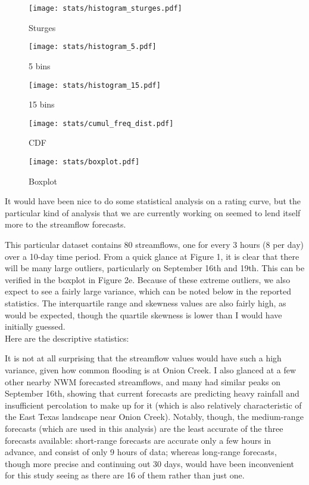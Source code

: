 \documentclass[10pt]{article}
\begin{document}
\begin{figure}[!htb]
  \texttt{[image: stats/histogram\_sturges.pdf]}
  \caption{Sturges}\label{fig:2a}
\endminipage\hfill
{}
  \texttt{[image: stats/histogram\_5.pdf]}
  \caption{5 bins}\label{fig:2b}
\endminipage\hfill
{}%
  \texttt{[image: stats/histogram\_15.pdf]}
  \caption{15 bins}\label{fig:2c}
\endminipage
\end{figure}

\begin{figure}[!htb]
  \texttt{[image: stats/cumul\_freq\_dist.pdf]}
  \caption{CDF}\label{fig:2d}
\endminipage\hfill
{}%
  \texttt{[image: stats/boxplot.pdf]}
  \caption{Boxplot}\label{fig:2e}
\endminipage
\end{figure}

It would have been nice to do some statistical analysis on a rating curve, but the particular kind of analysis that we are currently working on seemed to lend itself more to the streamflow forecasts.

This particular dataset contains 80 streamflows, one for every 3 hours (8 per day) over a 10-day time period. From a quick glance at Figure 1, it is clear that there will be many large outliers, particularly on September 16th and 19th. This can be verified in the boxplot in Figure 2e. Because of these extreme outliers, we also expect to see a fairly large variance, which can be noted below in the reported statistics. The interquartile range and skewness values are also fairly high, as would be expected, though the quartile skewness is lower than I would have initially guessed. \\


\noindent
Here are the descriptive statistics: 

\vspace{2ex}

\begingroup
\obeylines

\endgroup

\vspace{2ex}

It is not at all surprising that the streamflow values would have such a high variance, given how common flooding is at Onion Creek. I also glanced at a few other nearby NWM forecasted streamflows, and many had similar peaks on September 16th, showing that current forecasts are predicting heavy rainfall and insufficient percolation to make up for it (which is also relatively characteristic of the East Texas landscape near Onion Creek). Notably, though, the medium-range forecasts (which are used in this analysis) are the least accurate of the three forecasts available: short-range forecasts are accurate only a few hours in advance, and consist of only 9 hours of data; whereas long-range forecasts, though more precise and continuing out 30 days, would have been inconvenient for this study seeing as there are 16 of them rather than just one. 
\end{document}
